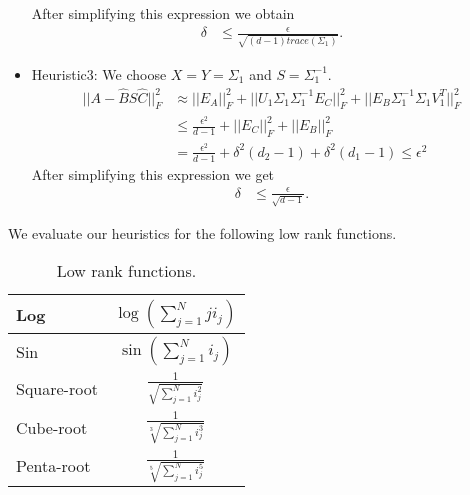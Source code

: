 \documentclass[runningheads]{llncs}
\begin{document}
\begin{itemize}
	
	\noindent After simplifying this expression we obtain
	\begin{align*}
	\delta &\le \frac{\epsilon}{\sqrt{(d-1)trace(\Sigma_1)}}.
	\end{align*}
	
	\item Heuristic3: We choose $X=Y=\Sigma_1$ and $S=\Sigma_1^{-1}$.
	\begin{align*}
	||A - \hat{B} S \hat{C}||_F^2 &\approx ||E_A||_F^2 + ||U_1\Sigma_1 \Sigma_1^{-1} E_C||_F^2 + ||E_B \Sigma_1^{-1} \Sigma_1 V_1^T||_F^2\\
	&\le  \frac{\epsilon^2}{d-1} + ||E_C||_F^2 +  ||E_B||_F^2 \\
	&= \frac{\epsilon^2}{d-1} + \delta^2 (d_2 -1) + \delta^2 (d_1-1) \le \epsilon^2
	\end{align*}
	\noindent After simplifying this expression we get
	\begin{align*}
	\delta &\le \frac{\epsilon}{\sqrt{d-1}}.
	\end{align*}	
\end{itemize}



\noindent {}


\newpage

\noindent We evaluate our heuristics for the following low rank functions.
\begin{table}[htb]
	\centering
	\begin{tabular}{|l|c|}
		\hline
		Log & $\log(\sum_{j=1}^{N}j i_j)$\\ \hline
		Sin & $\sin(\sum_{j=1}^{N}i_j)$\\ \hline
		Square-root & $\frac{1}{\sqrt{\sum_{j=1}^{N}i_j^2}}$\\ \hline
		Cube-root & $\frac{1}{\sqrt[3]{\sum_{j=1}^{N}i_j^3}}$\\ \hline
		Penta-root& $\frac{1}{\sqrt[5]{\sum_{j=1}^{N}i_j^5}}$\\ \hline
	\end{tabular}
	\caption{Low rank functions.\label{tab:lowRankFunctions}}
\end{table}
\end{document}
